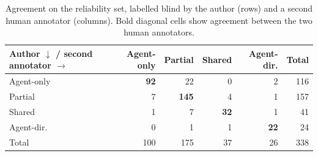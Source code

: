 \begin{table}[t]
\caption{Agreement on the reliability set, labelled blind by the author (rows) and a second human annotator (columns). Bold diagonal cells show agreement between the two human annotators.}
\label{tab:rel}
\small\setlength{\tabcolsep}{3.5pt}
\begin{tabular}{@{}lrrrrr@{}}
\toprule
Author $\downarrow$ / second annotator $\rightarrow$ & Agent-only & Partial & Shared & Agent-dir. & Total \\
\midrule
Agent-only & \textbf{92} & 22 & 0 & 2 & 116 \\
Partial & 7 & \textbf{145} & 4 & 1 & 157 \\
Shared & 1 & 7 & \textbf{32} & 1 & 41 \\
Agent-dir. & 0 & 1 & 1 & \textbf{22} & 24 \\
\midrule
Total & 100 & 175 & 37 & 26 & 338 \\
\bottomrule
\end{tabular}
\end{table}
